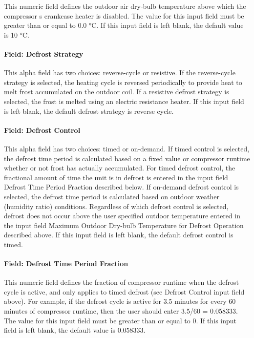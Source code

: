 This numeric field defines the outdoor air dry-bulb temperature above which the compressor s crankcase heater is disabled. The value for this input field must be greater than or equal to 0.0 °C. If this input field is left blank, the default value is 10 °C.

\paragraph{Field: Defrost Strategy}\label{field-defrost-strategy-2}

This alpha field has two choices: reverse-cycle or resistive. If the reverse-cycle strategy is selected, the heating cycle is reversed periodically to provide heat to melt frost accumulated on the outdoor coil. If a resistive defrost strategy is selected, the frost is melted using an electric resistance heater. If this input field is left blank, the default defrost strategy is reverse cycle.

\paragraph{Field: Defrost Control}\label{field-defrost-control-2}

This alpha field has two choices: timed or on-demand. If timed control is selected, the defrost time period is calculated based on a fixed value or compressor runtime whether or not frost has actually accumulated. For timed defrost control, the fractional amount of time the unit is in defrost is entered in the input field Defrost Time Period Fraction described below. If on-demand defrost control is selected, the defrost time period is calculated based on outdoor weather (humidity ratio) conditions. Regardless of which defrost control is selected, defrost does not occur above the user specified outdoor temperature entered in the input field Maximum Outdoor Dry-bulb Temperature for Defrost Operation described above. If this input field is left blank, the default defrost control is timed.

\paragraph{Field: Defrost Time Period Fraction}\label{field-defrost-time-period-fraction-2}

This numeric field defines the fraction of compressor runtime when the defrost cycle is active, and only applies to timed defrost (see Defrost Control input field above). For example, if the defrost cycle is active for 3.5 minutes for every 60 minutes of compressor runtime, then the user should enter 3.5/60 = 0.058333. The value for this input field must be greater than or equal to 0. If this input field is left blank, the default value is 0.058333.

